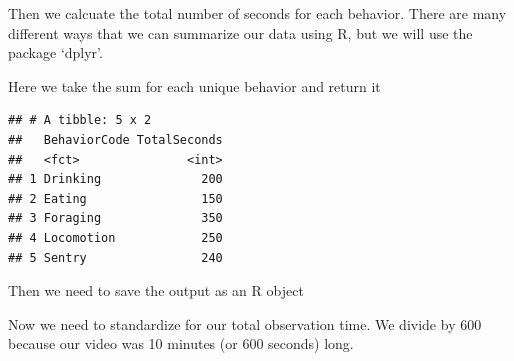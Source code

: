\documentclass[]{book}
\newenvironment{Shaded}{\begin{snugshade}}{\end{snugshade}}
\newcommand{\DataTypeTok}[1]{\textcolor[rgb]{0.13,0.29,0.53}{#1}}
\newcommand{\DecValTok}[1]{\textcolor[rgb]{0.00,0.00,0.81}{#1}}
\newcommand{\KeywordTok}[1]{\textcolor[rgb]{0.13,0.29,0.53}{\textbf{#1}}}
\newcommand{\NormalTok}[1]{#1}
\newcommand{\OperatorTok}[1]{\textcolor[rgb]{0.81,0.36,0.00}{\textbf{#1}}}
\newcommand{\StringTok}[1]{\textcolor[rgb]{0.31,0.60,0.02}{#1}}
\begin{document}
Then we calcuate the total number of seconds for each behavior. There are many different ways that we can summarize our data using R, but we will use the package `dplyr'.

Here we take the sum for each unique behavior and return it

\begin{Shaded}
\end{Shaded}

\begin{verbatim}
## # A tibble: 5 x 2
##   BehaviorCode TotalSeconds
##   <fct>               <int>
## 1 Drinking              200
## 2 Eating                150
## 3 Foraging              350
## 4 Locomotion            250
## 5 Sentry                240
\end{verbatim}

Then we need to save the output as an R object

\begin{Shaded}
\end{Shaded}

Now we need to standardize for our total observation time. We divide by 600 because our video was 10 minutes (or 600 seconds) long.

\begin{Shaded}
\end{Shaded}
\end{document}
